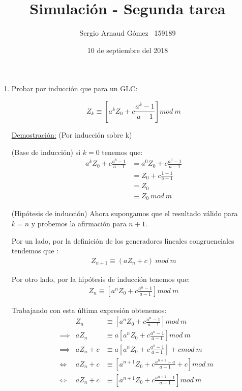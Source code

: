 \documentclass[12 pt]{article}\usepackage[]{graphicx}\usepackage[]{color}
\title{Simulación - Segunda tarea}
\author{Sergio Arnaud Gómez \quad \quad \ 159189}
\date{10 de septiembre del 2018}
\begin{document}
\maketitle
\begin{enumerate}
    

    \item Probar por inducción que para un GLC:
    
    \[ Z_k \equiv \left[a^kZ_0 + c\frac{a^k - 1}{a - 1}\right] mod \ m \] 
    
    \underline{Demostración:} (Por inducción sobre k)
    
    (Base de inducción) si $k=0$ tenemos que:
    \begin{align*}
        a^kZ_0 + c\frac{a ^k - 1}{a - 1} &=
        a^0Z_0 + c\frac{a^0 - 1}{a - 1}\\ &=
        Z_0 + c\frac{1 - 1}{a - 1} \\ &=
        Z_0 \\ &\equiv Z_0 \ mod  \ m
    \end{align*}
    
    (Hipótesis de inducción) Ahora supongamos que el resultado válido para $k=n$ y probemos la afirmación para $n+1$. 
    
    Por un lado, por la definición de los generadores lineales congruenciales tendemos que :
    \begin{align*}
        Z_{n+1} \equiv (aZ_n + c) \ mod \ m \tag{1} \label{eq:1}
    \end{align*}
    
    Por otro lado, por la hipótesis de inducción tenemos que:
    \begin{align*}
        Z_n \equiv \left[a^nZ_0 + c\frac{a^n - 1}{a - 1}\right] mod \ m 
    \end{align*}
    
    Trabajando con esta última expresión obtenemos:
    \begin{align*}
        & & Z_n &\equiv \left[a^nZ_0 + c\frac{a^n - 1}{a - 1}\right] mod \ m \\
        & \implies & aZ_n &\equiv a\left[a^nZ_0 + c\frac{a^n - 1}{a - 1}\right] mod \ m \\
        & \implies & aZ_n + c &\equiv a\left[a^nZ_0 + c\frac{a^n - 1}{a - 1}\right] + c mod \ m \\
        & \iff & aZ_n + c &\equiv \left[a^{n+1}Z_0 + c\frac{a^{n+1} - a}{a - 1} + c\right] mod \ m \\
        & \iff & aZ_n + c &\equiv \left[a^{n+1}Z_0 + c\frac{a^{n+1} - 1}{a - 1} \right] mod \ m  \tag{2} \label{eq:2} \\ 
    \end{align*}
    

\end{enumerate}
\end{document}
